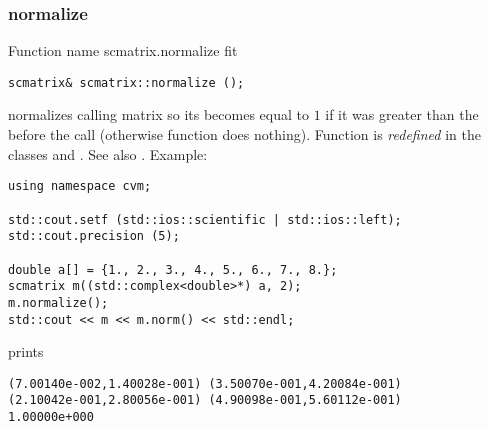 \subsubsection{normalize}
Function%
\pdfdest name {scmatrix.normalize} fit
\begin{verbatim}
scmatrix& scmatrix::normalize ();
\end{verbatim}
normalizes  calling matrix so its 
becomes equal to $1$ if it was greater than the 
before the call (otherwise function does nothing).
Function is \emph{redefined} in the classes
and .
See also .
Example:
\begin{Verbatim}
using namespace cvm;

std::cout.setf (std::ios::scientific | std::ios::left); 
std::cout.precision (5);

double a[] = {1., 2., 3., 4., 5., 6., 7., 8.};
scmatrix m((std::complex<double>*) a, 2);
m.normalize();
std::cout << m << m.norm() << std::endl;
\end{Verbatim}
prints
\begin{Verbatim}
(7.00140e-002,1.40028e-001) (3.50070e-001,4.20084e-001)
(2.10042e-001,2.80056e-001) (4.90098e-001,5.60112e-001)
1.00000e+000
\end{Verbatim}
\newpage




